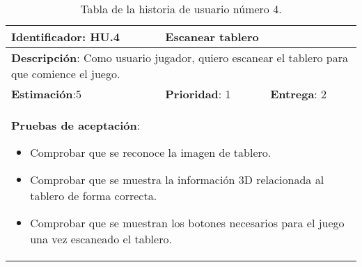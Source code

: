 \begin{table}[h]
  \begin{center}
    \begin{tabular}{|p{4cm}|p{4cm}|p{4cm}|}

    \hline
    \textbf{Identificador}: HU.4
    & \multicolumn{2}{p{8cm}|}{Escanear tablero}\\

    \hline
    \multicolumn{3}{|p{12cm}|}{\textbf{Descripción}: Como usuario jugador, quiero escanear el tablero para que comience el juego.}\\

    \hline
    \textbf{Estimación}:5
    & \textbf{Prioridad}: 1
    & \textbf{Entrega}: 2\\

    \hline
    \multicolumn{3}{|p{12cm}|}{\textbf{Pruebas de aceptación}:
      \begin{itemize}
        \item Comprobar que se reconoce la imagen de tablero.
        \item Comprobar que se muestra la información 3D relacionada al tablero de forma correcta.
        \item Comprobar que se muestran los botones necesarios para el juego una vez escaneado el tablero.
      \end{itemize}
    }\\

    \hline

    \end{tabular}

    \caption{Tabla de la historia de usuario número 4.}
    \label{tabla-hu4}

  \end{center}
\end{table}

